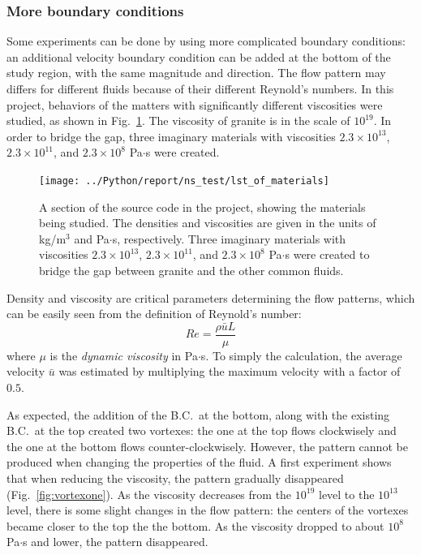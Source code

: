 \documentclass[11pt]{article}
\numberwithin{figure}{section}  %
\numberwithin{equation}{section}  %
\begin{document}
\begin{multicols}{2}
\subsubsection{More boundary conditions}

Some experiments can be done by using more complicated boundary conditions: an additional velocity boundary condition can be added at the bottom of the study region, with the same magnitude and direction. The flow pattern may differs for different fluids because of their different Reynold's numbers. In this project, behaviors of the matters with significantly different viscosities were studied, as shown in Fig.\ \ref{fig:materials}. The viscosity of granite is in the scale of $10^{19}$. In order to bridge the gap, three imaginary materials with viscosities $2.3\times10^{13}$, $2.3\times10^{11}$, and $2.3\times10^{8}$ Pa$\cdot$s were created.

\begin{figure}[!htb]
	\centering
	\texttt{[image: ../Python/report/ns\_test/lst\_of\_materials]}
	\caption{A section of the source code in the project, showing the materials being studied. The densities and viscosities are given in the units of kg/m$^3$ and Pa$\cdot$s, respectively. Three imaginary materials with viscosities $2.3\times10^{13}$, $2.3\times10^{11}$, and $2.3\times10^{8}$ Pa$\cdot$s were created to bridge the gap between granite and the other common fluids.}
	\label{fig:materials}
\end{figure}

Density and viscosity are critical parameters determining the flow patterns, which can be easily seen from the definition of Reynold's number:
\begin{equation}\label{eq:reynolds}
	Re = \dfrac{\rho\bar{u}L}{\mu}
\end{equation}
where $\mu$ is the \emph{dynamic viscosity} in Pa$\cdot$s. To simply the calculation, the average velocity $\bar{u}$ was estimated by multiplying the maximum velocity with a factor of $0.5$.

As expected, the addition of the B.C.\ at the bottom, along with the existing B.C.\ at the top created two vortexes: the one at the top flows clockwisely and the one at the bottom flows counter-clockwisely. However, the pattern cannot be produced when changing the properties of the fluid. A first experiment shows that when reducing the viscosity, the pattern gradually disappeared (Fig.\ \ref{fig:vortexone}). As the viscosity decreases from the $10^{19}$ level to the $10^{13}$ level, there is some slight changes in the flow pattern: the centers of the vortexes became closer to the top the the bottom. As the viscosity dropped to about $10^8$ Pa$\cdot$s and lower, the pattern disappeared.


\end{multicols}
\end{document}
